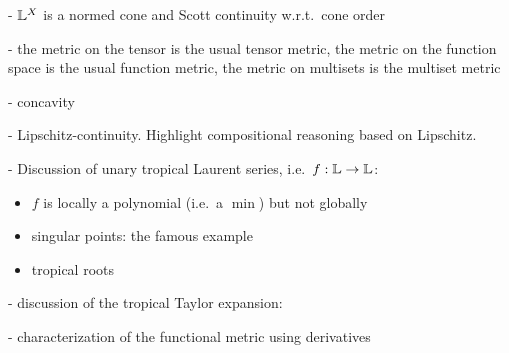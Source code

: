 - $\mathbb{L}^X$ is a normed cone and Scott continuity w.r.t.\ cone order

- the metric on the tensor is the usual tensor metric, the metric on the function space is the usual function metric, the metric on multisets is the multiset metric

- concavity

- Lipschitz-continuity. Highlight compositional reasoning based on Lipschitz.

- Discussion of unary tropical Laurent series, i.e.~$f:\mathbb{L} \to \mathbb{L}$:
\begin{itemize}

\item $f$ is locally a polynomial (i.e.~a $\min$) but not globally

\item singular points: the famous example

\item tropical roots


\end{itemize}



- discussion of the tropical Taylor expansion: 


- characterization of the functional metric using derivatives







